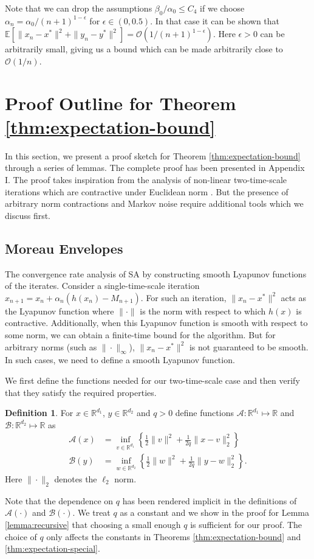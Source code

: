 \documentclass[letterpaper, 10 pt, conference]{ieeeconf}  %
\theoremstyle{definition}
\newtheorem{definition}{Definition}
\theoremstyle{plain}
\newcommand{\xstar}{x^*}
\newcommand{\ystar}{y^*}
\newcommand{\RR}{\mathbb{R}}
\newcommand{\EE}{\mathbb{E}}
\newcommand{\Acal}{\mathcal{A}}
\newcommand{\Bcal}{\mathcal{B}}
\begin{document}
Note that we can drop the assumptions $\beta_0/\alpha_0\leq C_4$ if we choose $\alpha_n=\alpha_0/(n+1)^{1-\epsilon}$ for $\epsilon\in(0,0.5)$. In that case it can be shown that $\EE[\|x_n-\xstar\|^2+\|y_n-\ystar\|^2]= \mathcal{O}(1/(n+1)^{1-\epsilon})$. Here $\epsilon>0$ can be arbitrarily small, giving us a bound which can be made arbitrarily close to $\mathcal{O}(1/n)$. 

\section{Proof Outline for Theorem \ref{thm:expectation-bound}}\label{sec:outline}
In this section, we present a proof sketch for Theorem \ref{thm:expectation-bound} through a series of lemmas. The complete proof has been presented in Appendix I. The proof takes inspiration from the analysis of non-linear two-time-scale iterations which are contractive under Euclidean norm \cite{Doan}. But the presence of arbitrary norm contractions and Markov noise require additional tools which we discuss first.
\subsection{Moreau Envelopes}
The convergence rate analysis of SA by constructing smooth Lyapunov functions of the iterates. Consider a single-time-scale iteration $x_{n+1}=x_n+\alpha_n(h(x_n)-M_{n+1})$. For such an iteration, $\|x_n-\xstar\|^2$ acts as the Lyapunov function where $\|\cdot\|$ is the norm with respect to which $h(x)$ is contractive. Additionally, when this Lyapunov function is smooth with respect to some norm, we can obtain a finite-time bound for the algorithm. But for arbitrary norms (such as $\|\cdot\|_\infty$), $\|x_n-\xstar\|^2$ is not guaranteed to be smooth. In such cases, we need to define a smooth Lyapunov function. 

We first define the functions needed for our two-time-scale case and then verify that they satisfy the required properties.
\begin{definition}\label{defn:Moreau}
    For $x\in\RR^{d_1}$, $y\in\RR^{d_2}$ and $q>0$ define functions $\Acal:\RR^{d_1}\mapsto\RR$ and $\Bcal:\RR^{d_2}\mapsto\RR$ as 
\begin{align*}
\Acal(x)&=\inf_{v\in\RR^{d_1}}\left\{\frac{1}{2}\|v\|^2+\frac{1}{2q}\|x-v\|_2^2\right\}    \\
\Bcal(y)&=\inf_{w\in\RR^{d_2}}\left\{\frac{1}{2}\|w\|^2+\frac{1}{2q}\|y-w\|_2^2\right\}.   
\end{align*}
Here $\|\cdot\|_2$ denotes the $\ell_2$ norm. 
\end{definition}
Note that the dependence on $q$ has been rendered implicit in the definitions of $\Acal(\cdot)$ and $\Bcal(\cdot)$. We treat $q$ as a constant and we show in the proof for Lemma \ref{lemma:recursive} that choosing a small enough $q$ is sufficient for our proof. The choice of $q$ only affects the constants in Theorems \ref{thm:expectation-bound} and \ref{thm:expectation-special}.
\end{document}
